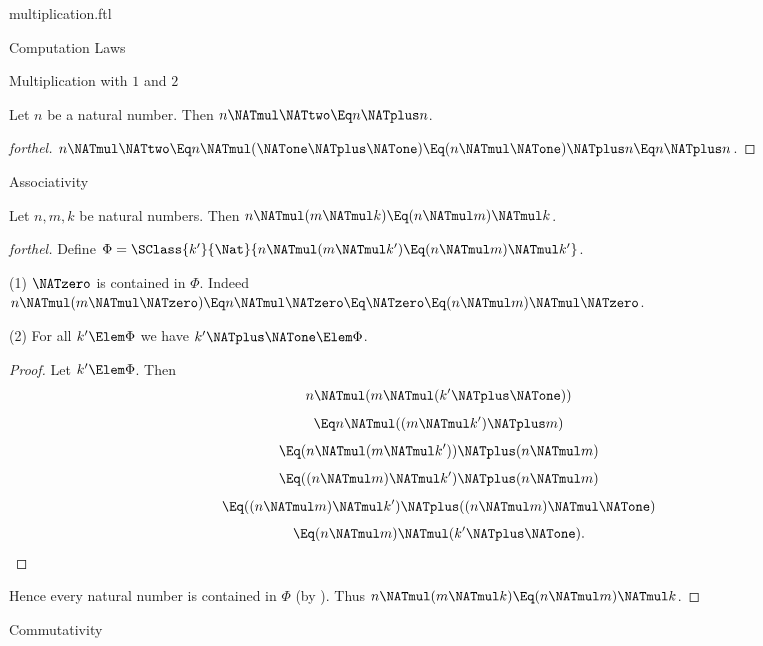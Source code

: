 \documentclass{stex}
\begin{document}
\begin{smodule}{multiplication.ftl}
\begin{sfragment}{Computation Laws}
\begin{sfragment}{Multiplication with $1$ and $2$}
    \begin{corollary}[forthel]
      Let $n$ be a natural number.
      Then $n \NATmul \NATtwo \Eq n \NATplus n$.
    \end{corollary}
    \begin{proof}[forthel]
      $n \NATmul \NATtwo
        \Eq n \NATmul (\NATone \NATplus \NATone)
        \Eq (n \NATmul \NATone) \NATplus n
        \Eq n \NATplus n$.
    \end{proof}
  \end{sfragment}

  \begin{sfragment}{Associativity}
    \begin{proposition}[forthel]
      Let $n, m, k$ be natural numbers.
      Then $n \NATmul (m \NATmul k) \Eq (n \NATmul m) \NATmul k$.
    \end{proposition}
    \begin{proof}[forthel]
      Define $\Phi = \SClass{k'}{\Nat}{n \NATmul (m \NATmul k') \Eq (n \NATmul m) \NATmul k'}$.

      (1) $\NATzero$ is contained in $\Phi$.
      Indeed $n \NATmul (m \NATmul \NATzero)
        \Eq n \NATmul \NATzero
        \Eq \NATzero
        \Eq (n \NATmul m) \NATmul \NATzero$.

      (2) For all $k' \Elem \Phi$ we have $k' \NATplus \NATone \Elem \Phi$.
      \begin{proof}
        Let $k' \Elem \Phi$.
        Then
        \[  n \NATmul (m \NATmul (k' \NATplus \NATone))                          \]
        \[    \Eq n \NATmul ((m \NATmul k') \NATplus m)                      \]
        \[    \Eq (n \NATmul (m \NATmul k')) \NATplus (n \NATmul m)            \]
        \[    \Eq ((n \NATmul m) \NATmul k') \NATplus (n \NATmul m)            \]
        \[    \Eq ((n \NATmul m) \NATmul k') \NATplus ((n \NATmul m) \NATmul \NATone)  \]
        \[    \Eq (n \NATmul m) \NATmul (k' \NATplus \NATone).                     \]
      \end{proof}

      Hence every natural number is contained in $\Phi$ (by ).
      Thus $n \NATmul (m \NATmul k) \Eq (n \NATmul m) \NATmul k$.
    \end{proof}
  \end{sfragment}

  \begin{sfragment}{Commutativity}



\end{sfragment}
\end{sfragment}
\end{smodule}
\end{document}

